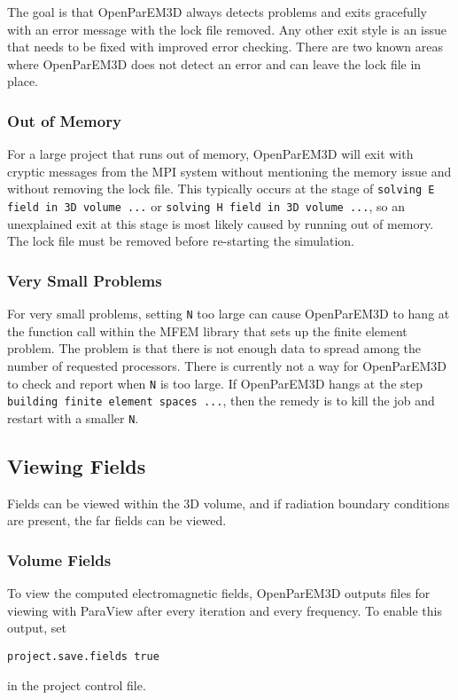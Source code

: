 \documentclass[titlepage]{article}
\renewcommand\_{\textunderscore\linebreak[1]}
\begin{document}
The goal is that OpenParEM3D always detects problems and exits gracefully with an error message with the lock file removed.  Any other exit style is an issue that needs to be fixed with improved error checking.  There are two known areas where OpenParEM3D does not detect an error and can leave the lock file in place.

\subsubsection{Out of Memory}

For a large project that runs out of memory, OpenParEM3D will exit with cryptic messages from the MPI system without mentioning the memory issue and without removing the lock file.  This typically occurs at the stage of \texttt{solving E field in 3D volume ...} or \texttt{solving H field in 3D volume ...}, so an unexplained exit at this stage is most likely caused by running out of memory.  The lock file must be removed before re-starting the simulation.

\subsubsection{Very Small Problems}

For very small problems, setting \verb+N+ too large can cause OpenParEM3D to hang at the function call within the MFEM library that sets up the finite element problem.  The problem is that there is not enough data to spread among the number of requested processors.  There is currently not a way for OpenParEM3D to check and report when \verb+N+ is too large.  If OpenParEM3D hangs at the step \texttt{building finite element spaces ...}, then the remedy is to kill the job and restart with a smaller \verb+N+.

\subsection{Viewing Fields}

Fields can be viewed within the 3D volume, and if radiation boundary conditions are present, the far fields can be viewed.

\subsubsection{Volume Fields}

To view the computed electromagnetic fields, OpenParEM3D outputs files for viewing with ParaView after every iteration and every frequency.  To enable this output, set
\begin{Verbatim}[fontsize=\small]
  project.save.fields true
\end{Verbatim}
\noindent in the project control file.
\end{document}
